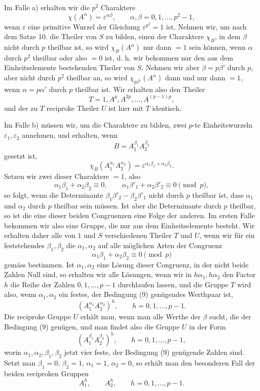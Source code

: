 \documentclass[11pt]{article}
\begin{document}
Im Falle a) erhalten wir die $p^2$ Charaktere
\[
\chi(A^\alpha)=\varepsilon^{\alpha\beta},
\qquad \alpha,\beta=0,1,\ldots,p^2-1,
\]
wenn $\varepsilon$ eine primitive Wurzel der Gleichung $\varepsilon^{p^2}=1$ ist. Nehmen wir, um nach dem Satze 10. die Theiler von $S$ zu bilden, einen der Charaktere $\chi_B$, in dem $\beta$ nicht durch $p$ theilbar ist, so wird $\chi_B(A^\alpha)$ nur dann $=1$ sein können, wenn $\alpha$ durch $p^2$ theilbar oder also $=0$ ist, d. h. wir bekommen nur den aus dem Einheitselemente bestehenden Theiler von $S$. Nehmen wir aber $\beta=p\beta'$ durch $p$, aber nicht durch $p^2$ theilbar an, so wird $\chi_{p\beta'}(A^\alpha)$ dann und nur dann $=1$, wenn $\alpha=p\alpha'$ durch $p$ theilbar ist. Wir erhalten also den Theiler
\[
T=1,A^p,A^{2p},\ldots,A^{(p-1)p},
\]
und der zu $T$ reciproke Theiler $U$ ist hier mit $T$ identisch.

Im Falle b) müssen wir, um die Charaktere zu bilden, zwei $p$-te Einheitswurzeln $\varepsilon_1,\varepsilon_2$ annehmen, und erhalten, wenn
\[
B=A_1^{\beta_1}A_2^{\beta_2}
\]
gesetzt ist,
\[
\chi_B(A_1^{\alpha_1}A_2^{\alpha_2})=
\varepsilon^{\alpha_1\beta_1+\alpha_2\beta_2}.
\]
Setzen wir zwei dieser Charaktere $=1$, also
\[
\alpha_1\beta_1+\alpha_2\beta_2\equiv0,
\qquad
\alpha_1\beta'_1+\alpha_2\beta'_2\equiv0 \pmod p,
\]
so folgt, wenn die Determinante $\beta_1\beta'_2-\beta_2\beta'_1$ nicht durch $p$ theilbar ist, dass $\alpha_1$ und $\alpha_2$ durch $p$ theilbar sein müssen. Ist aber die Determinante durch $p$ theilbar, so ist die eine dieser beiden Congruenzen eine Folge der anderen. Im ersten Falle bekommen wir also eine Gruppe, die nur aus dem Einheitselemente besteht. Wir erhalten daher alle von $1$ und $S$ verschiedenen Theiler $T$ und $U$, wenn wir für ein feststehendes $\beta_1,\beta_2$ die $\alpha_1,\alpha_2$ auf alle möglichen Arten der Congruenz
\begin{equation}
\alpha_1\beta_1+\alpha_2\beta_2\equiv0\pmod p
\tag{9}
\end{equation}
gemäss bestimmen. Ist $\alpha_1,\alpha_2$ eine Lösung dieser Congruenz, in der nicht beide Zahlen Null sind, so erhalten wir alle Lösungen, wenn wir in $h\alpha_1,h\alpha_2$ den Factor $h$ die Reihe der Zahlen $0,1,
\ldots,p-1$ durchlaufen lassen, und die Gruppe $T$ wird also, wenn $\alpha_1,\alpha_2$ ein festes, der Bedingung (9) genügendes Werthpaar ist,
\[
(A_1^{\alpha_1}A_2^{\alpha_2})^h,
\qquad h=0,1,\ldots,p-1.
\]
Die reciproke Gruppe $U$ erhält man, wenn man alle Werthe der $\beta$ sucht, die der Bedingung (9) genügen, und man findet also die Gruppe $U$ in der Form
\[
(A_1^{\beta_1}A_2^{\beta_2})^h,
\qquad h=0,1,\ldots,p-1,
\]
worin $\alpha_1,\alpha_2,\beta_1,\beta_2$ jetzt vier feste, der Bedingung (9) genügende Zahlen sind. Setzt man $\beta_1=0$, $\beta_2=1$, $\alpha_1=1$, $\alpha_2=0$, so erhält man den besonderen Fall der beiden reciproken Gruppen
\[
A_1^h,
\qquad A_2^h,
\qquad h=0,1,\ldots,p-1.
\]
\end{document}
